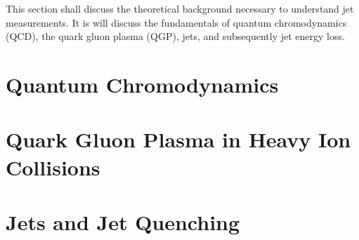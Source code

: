 
This section shall discuss the theoretical background necessary to understand jet measurements. It is will discuss the fundamentals of quantum chromodynamics (QCD), the quark gluon plasma (QGP),  jets, and subsequently jet energy loss. 


\section{Quantum Chromodynamics}
\label{sec:qcd}


\section{Quark Gluon Plasma in Heavy Ion Collisions}
\label{sec:qgp}


\section{Jets and Jet Quenching}
\label{sec:jets}

